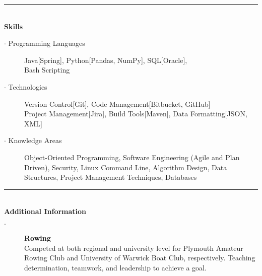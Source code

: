 \documentclass[12pt, a4paper]{article}
\begin{document}
\vspace{-2ex}
\noindent\rule{8cm}{0.4pt} \\
\textbf{Skills}
  \begin{description}
    \item[$\cdot$ Programming Languages]  Java[Spring],
        Python[Pandas, NumPy],
        SQL[Oracle],
        \\Bash Scripting
    \item[$\cdot$ Technologies] Version Control[Git],
        Code Management[Bitbucket, GitHub]
        \\Project Management[Jira],
        Build Tools[Maven],
        Data Formatting[JSON, XML]
    \item[$\cdot$ Knowledge Areas] Object-Oriented Programming,
		Software Engineering (Agile and Plan Driven),
	    Security,
	    Linux Command Line,
        Algorithm Design,
        Data Structures,
        Project Management Techniques,
        Databases
  \end{description}

\vspace{-2ex}
\noindent\rule{8cm}{0.4pt} \\
\textbf{Additional Information}
  \begin{description}
    \item[$\cdot$] \textbf{Rowing} \\Competed at both regional and university level for Plymouth Amateur Rowing Club and University of Warwick Boat Club, respectively. Teaching determination, teamwork, and leadership to achieve a goal.

    \iffalse
    Rowing has taught me the value of team work, and has given me transferable skills including resilience, decision making, and precision, all of which I bring to the workplace.
    Time management $\cdot$ Team work $\cdot$ Resilience $\cdot$ Motivational skills $\cdot$ Quick thinking \\ $\cdot$ Technical planning $\cdot$ Precision
    \fi

  \end{description}
\end{document}
